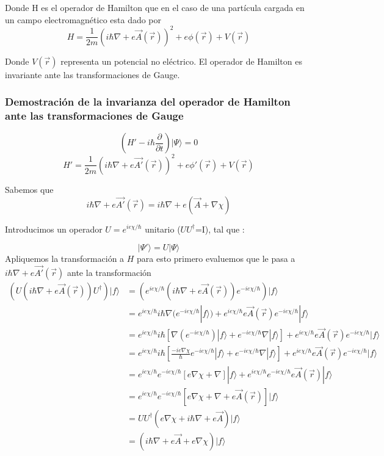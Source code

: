 \documentclass[12pt]{article}
\begin{document}
Donde H es el operador de Hamilton que en el caso de una partícula cargada en un campo electromagnético esta dado por
\begin{equation}
H=\frac{1}{2m}(i\hbar\nabla+e\vec{A}(\vec{r}))^2+e\phi(\vec{r})+V(\vec{r})
\end{equation}


Donde $V(\vec{r})$ representa un potencial no eléctrico.
El operador de Hamilton es invariante ante las transformaciones de Gauge.\\

\subsubsection{\textbf{Demostración de la invarianza del operador de Hamilton ante las transformaciones de Gauge}}
\begin{equation}
(H'-i\hbar\frac{\partial}{\partial t})|\Psi\rangle=0
\end{equation}
\begin{equation}
H'=\frac{1}{2m}(i\hbar\nabla+e\vec{A'}(\vec{r}))^2+e\phi'(\vec{r})+V(\vec{r})
\end{equation}

Sabemos que 
\begin{equation}
i\hbar\nabla+e\vec{A'}(\vec{r})=i\hbar\nabla+e(\vec{A}+\nabla\chi)
\end{equation}

Introducimos un operador $U=e^{ie\chi/\hbar}$  unitario ($UU^{\dag}$=I), tal que : 

\begin{equation}
|\Psi'\rangle=U|\Psi\rangle
\end{equation}
Apliquemos la transformación a $H$ para esto primero evaluemos que le pasa a $i\hbar\nabla+e\vec{A'}(\vec{r})$ ante la transformación
\begin{equation}
\begin{split}
(U(i\hbar\nabla+e\vec{A}(\vec{r}))U^{\dag})|f\rangle &=
(e^{ie\chi/\hbar}(i\hbar\nabla+e\vec{A}(\vec{r}))e^{-ie\chi/\hbar})|f\rangle \\
&=e^{ie\chi/\hbar}i\hbar\nabla(e^{-ie\chi/\hbar}|f\rangle)+e^{ie\chi/\hbar}e\vec{A}(\vec{r})e^{-ie\chi/\hbar}|f\rangle\\ 
&=e^{ie\chi/\hbar}i\hbar[\nabla (e^{-ie\chi/\hbar})|f\rangle+ e^{-ie\chi/\hbar}\nabla|f\rangle]+e^{ie\chi/\hbar}e\vec{A}(\vec{r})e^{-ie\chi/\hbar}|f\rangle\\ 
&=e^{ie\chi/\hbar}i\hbar[\frac{-ie\nabla \chi}{\hbar} e^{-ie\chi/\hbar}|f\rangle+ e^{-ie\chi/\hbar}\nabla|f\rangle]+e^{ie\chi/\hbar}e\vec{A}(\vec{r})e^{-ie\chi/\hbar}|f\rangle\\
&=e^{ie\chi/\hbar} e^{-ie\chi/\hbar}[e\nabla \chi+ \nabla]|f\rangle+e^{ie\chi/\hbar}e^{-ie\chi/\hbar}e\vec{A}(\vec{r})|f\rangle\\
&=e^{ie\chi/\hbar} e^{-ie\chi/\hbar}[e\nabla \chi+ \nabla+e\vec{A}(\vec{r})]|f\rangle\\
&=UU^{\dag}(e\nabla\chi+ i\hbar\nabla + e\vec{A}) |f\rangle \\ 
&=( i\hbar\nabla + e\vec{A}+e\nabla\chi) |f\rangle
\end{split}
\end{equation}
\end{document}
